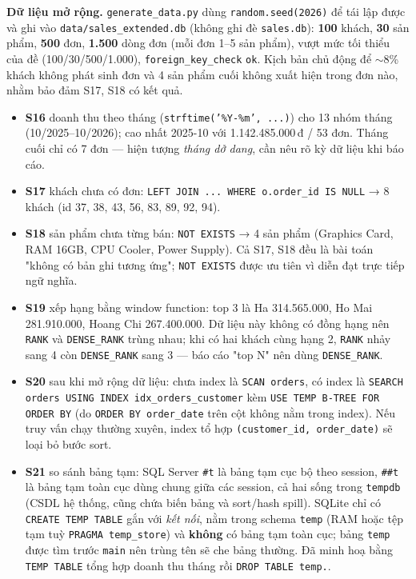 \documentclass[10pt,a4paper,twocolumn]{article}
\newcommand{\code}[1]{\texttt{\small #1}}
\begin{document}
\textbf{Dữ liệu mở rộng.} \code{generate\_data.py} dùng \code{random.seed(2026)} để tái lập được
và ghi vào \code{data/sales\_extended.db} (không ghi đè \code{sales.db}): \textbf{100} khách,
\textbf{30} sản phẩm, \textbf{500} đơn, \textbf{1.500} dòng đơn (mỗi đơn 1--5 sản phẩm), vượt mức
tối thiểu của đề (100/30/500/1.000), \code{foreign\_key\_check} \code{ok}. Kịch bản chủ động để
$\sim$8\% khách không phát sinh đơn và 4 sản phẩm cuối không xuất hiện trong đơn nào, nhằm bảo
đảm S17, S18 có kết quả.

\begin{itemize}
  \item \textbf{S16} doanh thu theo tháng (\code{strftime('\%Y-\%m', ...)}) cho 13 nhóm tháng
        (10/2025--10/2026); cao nhất 2025-10 với 1.142.485.000\,đ / 53 đơn. Tháng cuối chỉ có 7
        đơn --- hiện tượng \emph{tháng dở dang}, cần nêu rõ kỳ dữ liệu khi báo cáo.
  \item \textbf{S17} khách chưa có đơn: \code{LEFT JOIN ... WHERE o.order\_id IS NULL} → 8 khách
        (id 37, 38, 43, 56, 83, 89, 92, 94).
  \item \textbf{S18} sản phẩm chưa từng bán: \code{NOT EXISTS} → 4 sản phẩm (Graphics Card,
        RAM 16GB, CPU Cooler, Power Supply). Cả S17, S18 đều là bài toán "không có bản ghi tương
        ứng"; \code{NOT EXISTS} được ưu tiên vì diễn đạt trực tiếp ngữ nghĩa.
  \item \textbf{S19} xếp hạng bằng window function: top 3 là Ha 314.565.000, Ho Mai 281.910.000,
        Hoang Chi 267.400.000. Dữ liệu này không có đồng hạng nên \code{RANK} và \code{DENSE\_RANK}
        trùng nhau; khi có hai khách cùng hạng 2, \code{RANK} nhảy sang 4 còn \code{DENSE\_RANK}
        sang 3 --- báo cáo "top N" nên dùng \code{DENSE\_RANK}.
  \item \textbf{S20} sau khi mở rộng dữ liệu: chưa index là \code{SCAN orders}, có index là
        \code{SEARCH orders USING INDEX idx\_orders\_customer} kèm
        \code{USE TEMP B-TREE FOR ORDER BY} (do \code{ORDER BY order\_date} trên cột không nằm
        trong index). Nếu truy vấn chạy thường xuyên, index tổ hợp
        \code{(customer\_id, order\_date)} sẽ loại bỏ bước sort.
  \item \textbf{S21} so sánh bảng tạm: SQL Server \code{\#t} là bảng tạm cục bộ theo session,
        \code{\#\#t} là bảng tạm toàn cục dùng chung giữa các session, cả hai sống trong
        \code{tempdb} (CSDL hệ thống, cũng chứa biến bảng và sort/hash spill). SQLite chỉ có
        \code{CREATE TEMP TABLE} gắn với \emph{kết nối}, nằm trong schema \code{temp} (RAM hoặc
        tệp tạm tuỳ \code{PRAGMA temp\_store}) và \textbf{không} có bảng tạm toàn cục; bảng
        \code{temp} được tìm trước \code{main} nên trùng tên sẽ che bảng thường. Đã minh hoạ bằng
        \code{TEMP TABLE} tổng hợp doanh thu tháng rồi \code{DROP TABLE temp.}.
\end{itemize}
\end{document}

